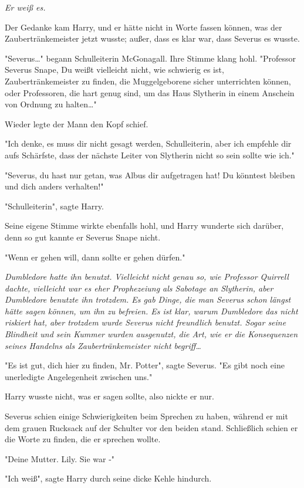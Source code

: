 {\emph{Er weiß es.}

Der Gedanke kam Harry, und er hätte nicht in Worte fassen können, was der Zaubertränkemeister jetzt wusste; außer, dass es klar war, dass Severus es wusste.

"Severus…" begann Schulleiterin McGonagall. Ihre Stimme klang hohl. "Professor Severus Snape, Du weißt vielleicht nicht, wie schwierig es ist, Zaubertränkemeister zu finden, die Muggelgeborene sicher unterrichten können, oder Professoren, die hart genug sind, um das Haus Slytherin in einem Anschein von Ordnung zu halten…"

Wieder legte der Mann den Kopf schief.

"Ich denke, es muss dir nicht gesagt werden, Schulleiterin, aber ich empfehle dir aufs Schärfste, dass der nächste Leiter von Slytherin nicht so sein sollte wie ich."

"Severus, du hast nur getan, was Albus dir aufgetragen hat! Du könntest bleiben und dich anders verhalten!"

"Schulleiterin", sagte Harry.

Seine eigene Stimme wirkte ebenfalls hohl, und Harry wunderte sich darüber, denn so gut kannte er Severus Snape nicht.

"Wenn er gehen will, dann sollte er gehen dürfen."

\emph{Dumbledore hatte ihn benutzt. Vielleicht nicht genau so, wie Professor Quirrell dachte, vielleicht war es eher Prophezeiung als Sabotage an Slytherin, aber Dumbledore benutzte ihn trotzdem. Es gab Dinge, die man Severus schon längst hätte sagen können, um ihn zu befreien. Es ist klar, warum Dumbledore das nicht riskiert hat, aber trotzdem wurde Severus nicht freundlich benutzt. Sogar seine Blindheit und sein Kummer wurden ausgenutzt, die Art, wie er die Konsequenzen seines Handelns als Zaubertränkemeister nicht begriff…}

"Es ist gut, dich hier zu finden, Mr. Potter", sagte Severus. "Es gibt noch eine unerledigte Angelegenheit zwischen uns."

Harry wusste nicht, was er sagen sollte, also nickte er nur.

Severus schien einige Schwierigkeiten beim Sprechen zu haben, während er mit dem grauen Rucksack auf der Schulter vor den beiden stand. Schließlich schien er die Worte zu finden, die er sprechen wollte.

"Deine Mutter. Lily. Sie war -"

"Ich weiß", sagte Harry durch seine dicke Kehle hindurch.

}
